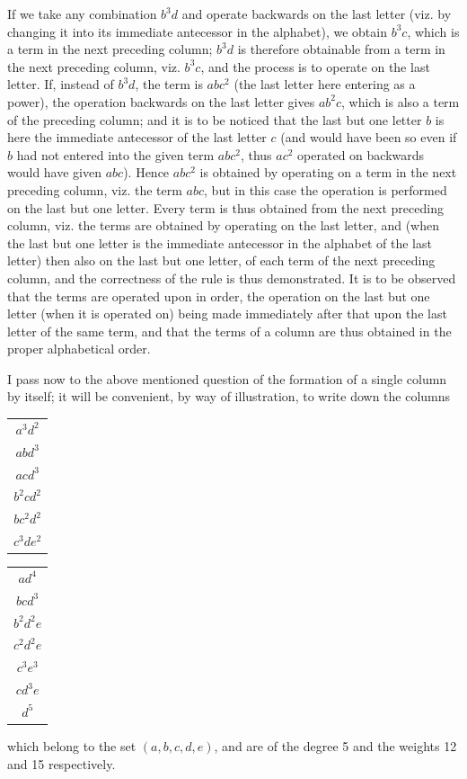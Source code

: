 \documentclass[11pt,a4paper]{article}
\theoremstyle{definition}
\begin{document}
If we take any combination $b^3d$ and operate backwards on the last letter (viz. by changing it into its immediate antecessor in the alphabet), we obtain $b^3c$, which is a term in the next preceding column; $b^3d$ is therefore obtainable from a term in the next preceding column, viz. $b^3c$, and the process is to operate on the last letter. If, instead of $b^3d$, the term is $abc^2$ (the last letter here entering as a power), the operation backwards on the last letter gives $ab^2c$, which is also a term of the preceding column; and it is to be noticed that the last but one letter $b$ is here the immediate antecessor of the last letter $c$ (and would have been so even if $b$ had not entered into the given term $abc^2$, thus $ac^2$ operated on backwards would have given $abc$). Hence $abc^2$ is obtained by operating on a term in the next preceding column, viz. the term $abc$, but in this case the operation is performed on the last but one letter. Every term is thus obtained from the next preceding column, viz. the terms are obtained by operating on the last letter, and (when the last but one letter is the immediate antecessor in the alphabet of the last letter) then also on the last but one letter, of each term of the next preceding column, and the correctness of the rule is thus demonstrated. It is to be observed that the terms are operated upon in order, the operation on the last but one letter (when it is operated on) being made immediately after that upon the last letter of the same term, and that the terms of a column are thus obtained in the proper alphabetical order.

I pass now to the above mentioned question of the formation of a single column by itself; it will be convenient, by way of illustration, to write down the columns
\begin{center}
\begin{tabular}{c}
$a^3d^2$ \\
$abd^3$ \\
$acd^3$ \\
$b^2cd^2$ \\
$bc^2d^2$ \\
$c^3de^2$ \\
\end{tabular}
\qquad
\begin{tabular}{c}
$ad^4$ \\
$bcd^3$ \\
$b^2d^2e$ \\
$c^2d^2e$ \\
$c^3e^3$ \\
$cd^3e$ \\
$d^5$ \\
\end{tabular}
\end{center}
which belong to the set $(a,b,c,d,e)$, and are of the degree 5 and the weights 12 and 15 respectively.
\end{document}

